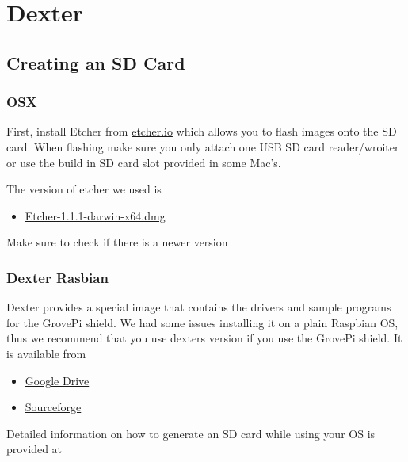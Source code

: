 \FILENAME

\section{Dexter}\label{dexter}

\subsection{Creating an SD Card}\label{creating-an-sd-card}

\subsubsection{OSX}\label{osx}

First, install Etcher from \href{https://etcher.io/}{etcher.io} which
allows you to flash images onto the SD card. When flashing make sure you
only attach one USB SD card reader/wroiter or use the build in SD card
slot provided in some Mac's.

The version of etcher we used is

\begin{itemize}
\tightlist
\item
  \href{https://github.com/resin-io/etcher/releases/download/v1.1.1/Etcher-1.1.1-darwin-x64.dmg}{Etcher-1.1.1-darwin-x64.dmg}
\end{itemize}

Make sure to check if there is a newer version

\subsubsection{Dexter Rasbian}\label{dexter-rasbian}

Dexter provides a special image that contains the drivers and sample
programs for the GrovePi shield. We had some issues installing it on a
plain Raspbian OS, thus we recommend that you use dexters version if you
use the GrovePi shield. It is available from

\begin{itemize}
\tightlist
\item
  \href{http://sourceforge.net/projects/dexterindustriesraspbianflavor/}{Google
  Drive}
\item
  \href{http://sourceforge.net/projects/dexterindustriesraspbianflavor/}{Sourceforge}
\end{itemize}

Detailed information on how to generate an SD card while using your OS
is provided at


